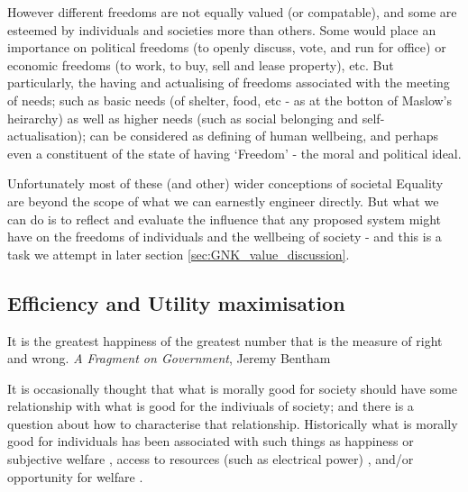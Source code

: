 However different freedoms are not equally valued (or compatable), and some are esteemed by individuals and societies more than others.
Some would place an importance on political freedoms (to openly discuss, vote, and run for office) or economic freedoms (to work, to buy, sell and lease property), etc. %
But particularly, the having and actualising of freedoms associated with the meeting of needs; such as basic needs (of shelter, food, etc - as at the botton of Maslow's heirarchy) as well as higher needs (such as social belonging and self-actualisation); can be considered as defining of human wellbeing, and perhaps even a constituent of the state of having `Freedom' - the moral and political ideal.

Unfortunately most of these (and other) wider conceptions of societal Equality are beyond the scope of what we can earnestly engineer directly. But what we can do is to reflect and evaluate the influence that any proposed system might have on the freedoms of individuals and the wellbeing of society - and this is a task we attempt in later section \ref{sec:GNK_value_discussion}.

\subsection{Efficiency and Utility maximisation}\label{sec:philosophy_efficiency}


\begin{displayquote}It is the greatest happiness of the greatest number that is the measure of right and wrong. \textit{A Fragment on Government}, Jeremy Bentham\cite{bentham2001fragment}
\end{displayquote} 

It is occasionally thought that what is morally good for society should have some relationship with what is good for the indiviuals of society; and there is a question about how to characterise that relationship.
Historically what is morally good for individuals has been associated with such things as happiness \cite{burns2005happiness} or subjective welfare \cite{10.2307/2264894}, access to resources (such as electrical power) \cite{10.2307/2265047}, and/or opportunity for welfare \cite{10.2307/4320203}.%

